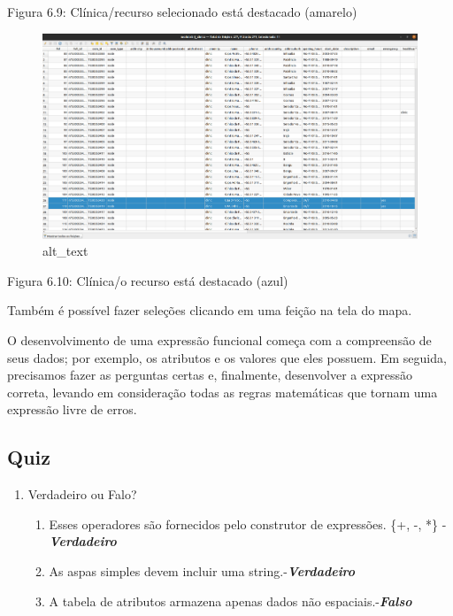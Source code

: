 \documentclass[
]{krantz}
\providecommand{\tightlist}{%
  \setlength{\itemsep}{0pt}\setlength{\parskip}{0pt}}
\begin{document}
Figura 6.9: Clínica/recurso selecionado está destacado (amarelo)

\begin{figure}
\centering
\includegraphics{media/modulo6/selected-attr.png}
\caption{alt\_text}
\end{figure}

Figura 6.10: Clínica/o recurso está destacado (azul)

Também é possível fazer seleções clicando em uma feição na tela do mapa.

O desenvolvimento de uma expressão funcional começa com a compreensão de seus dados; por exemplo, os atributos e os valores que eles possuem. Em seguida, precisamos fazer as perguntas certas e, finalmente, desenvolver a expressão correta, levando em consideração todas as regras matemáticas que tornam uma expressão livre de erros.

\hypertarget{quiz-15}{%
\subsection{Quiz}\label{quiz-15}}

\begin{enumerate}
\def\labelenumi{\arabic{enumi}.}
\item
  Verdadeiro ou Falo?

  \begin{enumerate}
  \def\labelenumii{\arabic{enumii}.}
  \tightlist
  \item
    Esses operadores são fornecidos pelo construtor de expressões. \{+, -, *\}
    -\textbf{\emph{Verdadeiro}}
  \item
    As aspas simples devem incluir uma string.-\textbf{\emph{Verdadeiro}}
  \item
    A tabela de atributos armazena apenas dados não espaciais.-\textbf{\emph{Falso}}
  \end{enumerate}
\end{enumerate}
\end{document}
